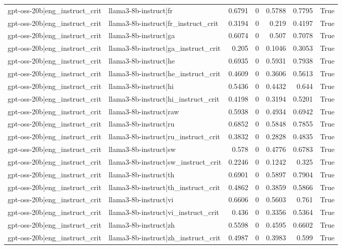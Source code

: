 \begin{table}
\begin{tabular}{l l r r r r l}
gpt-oss-20b|eng_instruct_crit & llama3-8b-instruct|fr & 0.6791 & 0 & 0.5788 & 0.7795 & True \\
gpt-oss-20b|eng_instruct_crit & llama3-8b-instruct|fr_instruct_crit & 0.3194 & 0 & 0.219 & 0.4197 & True \\
gpt-oss-20b|eng_instruct_crit & llama3-8b-instruct|ga & 0.6074 & 0 & 0.507 & 0.7078 & True \\
gpt-oss-20b|eng_instruct_crit & llama3-8b-instruct|ga_instruct_crit & 0.205 & 0 & 0.1046 & 0.3053 & True \\
gpt-oss-20b|eng_instruct_crit & llama3-8b-instruct|he & 0.6935 & 0 & 0.5931 & 0.7938 & True \\
gpt-oss-20b|eng_instruct_crit & llama3-8b-instruct|he_instruct_crit & 0.4609 & 0 & 0.3606 & 0.5613 & True \\
gpt-oss-20b|eng_instruct_crit & llama3-8b-instruct|hi & 0.5436 & 0 & 0.4432 & 0.644 & True \\
gpt-oss-20b|eng_instruct_crit & llama3-8b-instruct|hi_instruct_crit & 0.4198 & 0 & 0.3194 & 0.5201 & True \\
gpt-oss-20b|eng_instruct_crit & llama3-8b-instruct|raw & 0.5938 & 0 & 0.4934 & 0.6942 & True \\
gpt-oss-20b|eng_instruct_crit & llama3-8b-instruct|ru & 0.6852 & 0 & 0.5848 & 0.7855 & True \\
gpt-oss-20b|eng_instruct_crit & llama3-8b-instruct|ru_instruct_crit & 0.3832 & 0 & 0.2828 & 0.4835 & True \\
gpt-oss-20b|eng_instruct_crit & llama3-8b-instruct|sw & 0.578 & 0 & 0.4776 & 0.6783 & True \\
gpt-oss-20b|eng_instruct_crit & llama3-8b-instruct|sw_instruct_crit & 0.2246 & 0 & 0.1242 & 0.325 & True \\
gpt-oss-20b|eng_instruct_crit & llama3-8b-instruct|th & 0.6901 & 0 & 0.5897 & 0.7904 & True \\
gpt-oss-20b|eng_instruct_crit & llama3-8b-instruct|th_instruct_crit & 0.4862 & 0 & 0.3859 & 0.5866 & True \\
gpt-oss-20b|eng_instruct_crit & llama3-8b-instruct|vi & 0.6606 & 0 & 0.5603 & 0.761 & True \\
gpt-oss-20b|eng_instruct_crit & llama3-8b-instruct|vi_instruct_crit & 0.436 & 0 & 0.3356 & 0.5364 & True \\
gpt-oss-20b|eng_instruct_crit & llama3-8b-instruct|zh & 0.5598 & 0 & 0.4595 & 0.6602 & True \\
gpt-oss-20b|eng_instruct_crit & llama3-8b-instruct|zh_instruct_crit & 0.4987 & 0 & 0.3983 & 0.599 & True \\

\end{tabular}
\end{table}
